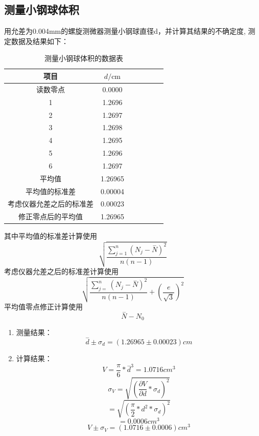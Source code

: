 \documentclass[a4paper,11pt]{article}
\begin{document}
\subsection{测量小钢球体积}
	用允差为0.004mm的螺旋测微器测量小钢球直径d，并计算其结果的不确定度, 测定数据及结果如下：
	
	\begin{table}[H]
		\centering\caption{测量小钢球体积的数据表}
		\small
		\begin{tabularx}{.85\linewidth}{C{1} *6{C{.8}}}
			\toprule
			\textbf{项目} &
			$d / \si{\cm}$ &\\
			\midrule
			读数零点     & 0.0000  &   \\
			1     & 1.2696  &   \\
			2     & 1.2697  &   \\
			3     & 1.2698  &   \\
			4     & 1.2695  &   \\
			5     & 1.2696  &   \\
			6     & 1.2697  &   \\
			平均值    & 1.26965  & \\
			平均值的标准差     & 0.00004  & \\
			考虑仪器允差之后的标准差     & 0.00023  & \\
			修正零点后的平均值     & 1.26965  & \\
			
			\bottomrule
		\end{tabularx}
		\vspace{3ex}
	\end{table}\noindent%

    其中平均值的标准差计算使用$$ \sqrt{\frac{\sum _{j=1}^{n}{\left({N}_{j}-\stackrel{-}{N}\right)}^{2}}{n\left(n-1\right)}} $$
    考虑仪器允差之后的标准差计算使用$$\sqrt{\frac{\sum _{j=}^{n}{\left({N}_{j}-\stackrel{-}{N}\right)}^{2}}{n\left(n-1\right)}+{\left(\frac{e}{\sqrt{3}}\right)}^{2}}$$
    平均值零点修正计算使用$$\stackrel{-}{N}-{N}_{0}$$
    
    \begin{enumerate}
    	\item 测量结果： 
    	$$\stackrel{-}{d} ± \sigma_{d} = (1.26965 ± 0.00023) cm$$
    	\item 计算结果：
    	$$V = \dfrac{\pi}{6} * \stackrel{-}{d}^{3} =  1.0716  cm^{3}$$
    	$$ \sigma_{V} = \sqrt{(\dfrac{\partial V}{\partial d} * \sigma_{d})^{2} } $$
    	$$ = \sqrt{(\dfrac{\pi}{2} * d^{2} *\sigma_{d} )^{2} } $$
    	$$ = 0.0006 cm^{3}$$
    	$$ V ± \sigma_{V} = ( 1.0716 ± 0.0006 ) cm^{3} $$
    \end{enumerate}
	
\end{document}
